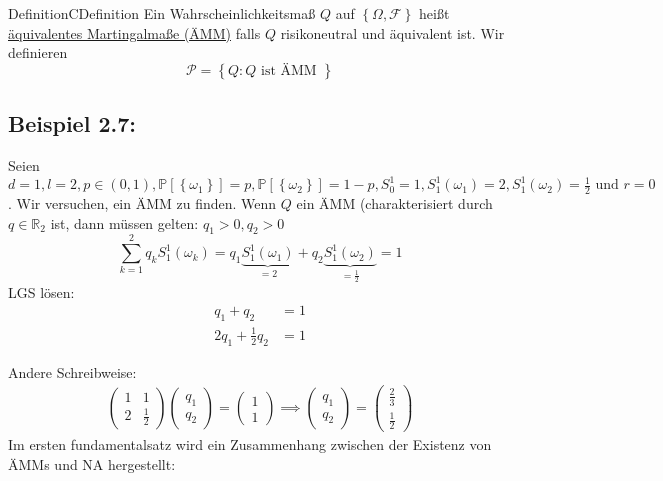 \documentclass[11.5 pt, a4paper]{memoir}
\begin{document}
\begin{ibox}[2.6]{Definition}{CDefinition}
	Ein Wahrscheinlichkeitsmaß $ Q $ auf $ \left\{ \Omega, \mathcal{F} \right\}  $ heißt \underline{äquivalentes Martingalmaße (ÄMM)}
	falls $ Q $ risikoneutral und äquivalent ist. Wir definieren 
	$$ \mathcal{P} = \left\{ Q : Q \text{ ist ÄMM }  \right\}  $$
	
\end{ibox}

\subsection*{Beispiel 2.7:} Seien $ d = 1, l = 2, p \in (0,1), \mathbb{P} \left[ \left\{ \omega_1 \right\}  \right] = p, \mathbb{P} \left[ \left\{ \omega_2 \right\}  \right] = 1 - p, S_0^{1} = 1, S_1^{1}(\omega_1) = 2, S_1^{1}(\omega_2)= \frac{1}{2} \text{ und }  r = 0  $. Wir versuchen, ein ÄMM zu finden. Wenn $ Q $ ein ÄMM (charakterisiert durch $ q \in \mathbb{R}_2 $ ist, dann müssen gelten:  
$ q_1 > 0, q_2 >0 $ 
 $$ \sum_{k=1}^{2} q_k S_1^{1} (\omega_k) = q_1 \underbrace{ S_1^{1} (\omega_1)}_{=2} + q_2 \underbrace{ S_1^{1} (\omega_2)}_{=\frac{1}{2} } = 1 $$
LGS lösen: 
\begin{align*}
	q_1 + q_2 &= 1 \\
	 2q_1 + \frac{1}{2} q_2 &= 1 
\end{align*}

Andere Schreibweise: 
\begin{align*}
\begin{pmatrix}
	1 & 1 \\
	2 & \frac{1}{2} 
\end{pmatrix} 
\begin{pmatrix}
	q_1 \\ q_2 
\end{pmatrix}
 = \begin{pmatrix}
	 1 \\ 1  
 \end{pmatrix} \implies \begin{pmatrix}
 	q_1 \\ q_2 
 \end{pmatrix}
 = \begin{pmatrix}
 	 \frac{2}{3} \\ \frac{1}{2} 
 \end{pmatrix}
\end{align*}
Im ersten fundamentalsatz wird ein Zusammenhang zwischen der Existenz von ÄMMs und NA hergestellt:
\end{document}
